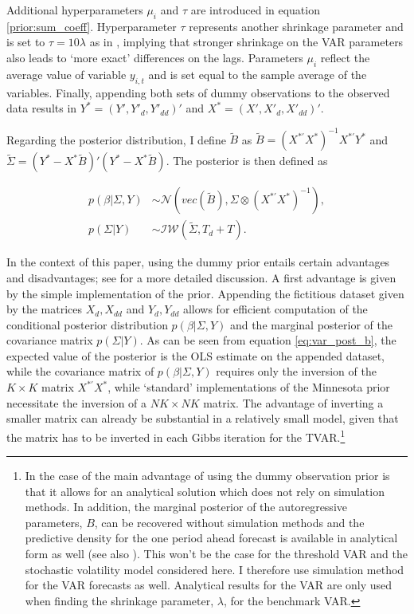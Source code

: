 \documentclass[12pt,letterpaper,fleqn]{article}           %
\begin{document}
Additional hyperparameters $\mu_i$ and $\tau$ are introduced in equation \eqref{prior:sum_coeff}. Hyperparameter $\tau$ represents another shrinkage parameter and is set to $\tau = 10 \lambda$ as in \textcite{banbura10}, implying that stronger shrinkage on the VAR parameters also leads to `more exact' differences on the lags. Parameters $\mu_i$ reflect the average value of variable $y_{i,t}$ and is set equal to the sample average of the variables. Finally, appending both sets of dummy observations to the observed data results in $Y^* = (Y', Y'_d, Y'_{dd})'$ and $X^* = (X', X'_d, X'_{dd})'$.

Regarding the posterior distribution, I define $\tilde{B}$ as $\tilde{B} = (X^{*'}X^*)^{-1}X^{*'}Y^*$ and $\tilde{\Sigma} = (Y^* - X^*\tilde{B})'(Y^{*} - X^*\tilde{B})$. The posterior is then defined as

\begin{align}
p(\beta|\Sigma, Y) &\sim \mathcal{N}(vec(\tilde{B}), \Sigma \otimes (X^{*'}X^*)^{-1}), \label{eq:var_post_b} \\
p(\Sigma|Y) &\sim \mathcal{IW}(\tilde{\Sigma}, T_d + T). \label{eq:var_post_cov}
\end{align}


In the context of this paper, using the dummy prior entails certain advantages and disadvantages; see \textcite{banbura10, koop13} for a more detailed discussion. A first advantage is given by the simple implementation of the prior. Appending the fictitious dataset given by the matrices $X_d, X_{dd}$ and $Y_d, Y_{dd}$ allows for efficient computation of the conditional posterior distribution $p(\beta|\Sigma, Y)$ and the marginal posterior of the covariance matrix $p(\Sigma|Y)$. 
As can be seen from  equation \eqref{eq:var_post_b}, the expected value of the posterior is the OLS estimate on the appended dataset, while the covariance matrix of $p(\beta|\Sigma, Y)$ requires only the inversion of the $K \times K$ matrix $X^{*'}X^*$, while `standard' implementations of the Minnesota prior necessitate the inversion of a $NK \times NK$ matrix. 
The advantage of inverting a smaller matrix can already be substantial in a relatively small model, given that the matrix has to be inverted in each Gibbs iteration for the TVAR.\footnote{\label{fn:analytic}In the case of \textcite{banbura10} the main advantage of using the dummy observation prior is that it allows for an analytical solution which does not rely on simulation methods. In addition, the marginal posterior of the autoregressive parameters, $B$, can be recovered without simulation methods and the predictive density for the one period ahead forecast is available in analytical form as well (see also \cite{koop13}). This won't be the case for the threshold VAR and the stochastic volatility model considered here. I therefore use simulation method for the VAR forecasts as well. Analytical results for the VAR are only used when finding the shrinkage parameter, $\lambda$, for the benchmark VAR.} 
\end{document}

